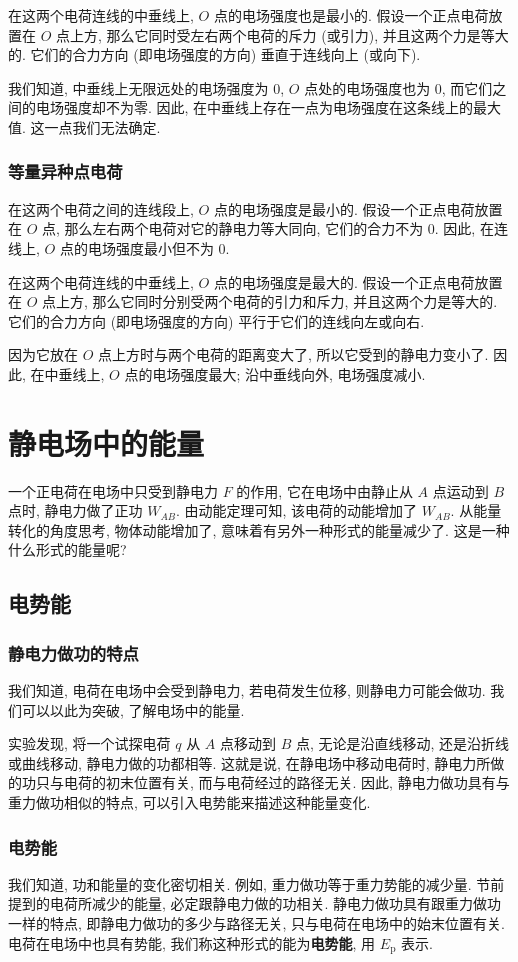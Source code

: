 \documentclass[UTF8,openany,fontset=fandol]{ctexbook}
\theoremstyle{chinesetextbook}
\begin{document}
在这两个电荷连线的中垂线上, $O$ 点的电场强度也是最小的. 假设一个正点电荷放置在 $O$ 点上方, 那么它同时受左右两个电荷的斥力 (或引力), 并且这两个力是等大的. 它们的合力方向 (即电场强度的方向) 垂直于连线向上 (或向下).

我们知道, 中垂线上无限远处的电场强度为 0, $O$ 点处的电场强度也为 0, 而它们之间的电场强度却不为零. 因此, 在中垂线上存在一点为电场强度在这条线上的最大值. 这一点我们无法确定.
\subsubsection{等量异种点电荷}
在这两个电荷之间的连线段上, $O$ 点的电场强度是最小的. 假设一个正点电荷放置在 $O$ 点, 那么左右两个电荷对它的静电力等大同向, 它们的合力不为 0. 因此, 在连线上, $O$ 点的电场强度最小但不为 0.

在这两个电荷连线的中垂线上, $O$ 点的电场强度是最大的. 假设一个正点电荷放置在 $O$ 点上方, 那么它同时分别受两个电荷的引力和斥力, 并且这两个力是等大的. 它们的合力方向 (即电场强度的方向) 平行于它们的连线向左或向右.

因为它放在 $O$ 点上方时与两个电荷的距离变大了, 所以它受到的静电力变小了. 因此, 在中垂线上, $O$ 点的电场强度最大; 沿中垂线向外, 电场强度减小.
\section{静电场中的能量}
一个正电荷在电场中只受到静电力 $F$ 的作用, 它在电场中由静止从 $A$ 点运动到 $B$ 点时, 静电力做了正功 $W_{AB}$. 由动能定理可知, 该电荷的动能增加了 $W_{AB}$. 从能量转化的角度思考, 物体动能增加了, 意味着有另外一种形式的能量减少了. 这是一种什么形式的能量呢?
\subsection{电势能}
\subsubsection{静电力做功的特点}\label{sec:section:静电力做功的特点}
我们知道, 电荷在电场中会受到静电力, 若电荷发生位移, 则静电力可能会做功. 我们可以以此为突破, 了解电场中的能量.

实验发现, 将一个试探电荷 $q$ 从 $A$ 点移动到 $B$ 点, 无论是沿直线移动, 还是沿折线或曲线移动, 静电力做的功都相等. 这就是说, 在静电场中移动电荷时, 静电力所做的功只与电荷的初末位置有关, 而与电荷经过的路径无关. 因此, 静电力做功具有与重力做功相似的特点, 可以引入电势能来描述这种能量变化.
\subsubsection{电势能}
我们知道, 功和能量的变化密切相关. 例如, 重力做功等于重力势能的减少量. 节前提到的电荷所减少的能量, 必定跟静电力做的功相关. 静电力做功具有跟重力做功一样的特点, 即静电力做功的多少与路径无关, 只与电荷在电场中的始末位置有关. 电荷在电场中也具有势能, 我们称这种形式的能为\textbf{电势能}, 用 $E_\text{p}$ 表示.
\end{document}
